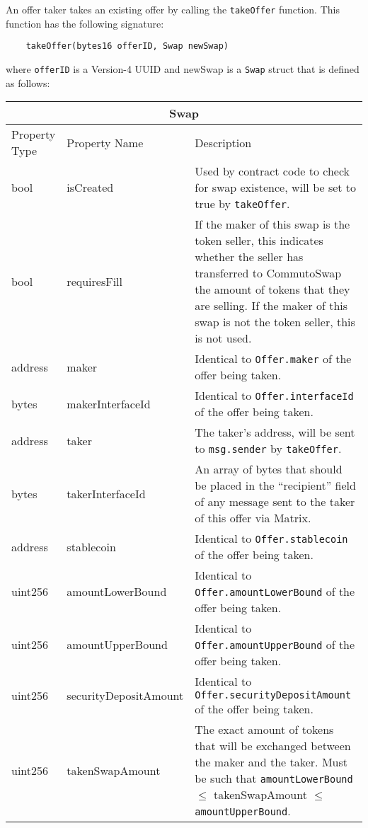 \documentclass[11pt]{article}
\begin{document}
    An offer taker takes an existing offer by calling the \verb|takeOffer| function.
    This function has the following signature:
    \begin{verbatim}
    takeOffer(bytes16 offerID, Swap newSwap)
    \end{verbatim}
    where \verb|offerID| is a Version-4 UUID and newSwap is a \verb|Swap| struct that is defined as
    follows:
    \begin{longtable}[p]{ |p{2.5cm}|p{4cm}|p{7cm}| }
        \hline
        \multicolumn{3}{|c|}{Swap} \\
        \hline
        Property Type & Property Name & Description \\
        \hline
        bool & isCreated & Used by contract code to check for swap existence, will be set to true by \verb|takeOffer|. \\
        bool & requiresFill & If the maker of this swap is the token seller, this indicates whether the seller has transferred to CommutoSwap the amount of tokens that they are selling.
        If the maker of this swap is not the token seller, this is not used. \\
        address & maker & Identical to \verb|Offer.maker| of the offer being taken. \\
        bytes & makerInterfaceId & Identical to \verb|Offer.interfaceId| of the offer being taken. \\
        address & taker & The taker's address, will be sent to \verb|msg.sender| by \verb|takeOffer|. \\
        bytes & takerInterfaceId & An array of bytes that should be placed in the “recipient” field of
        any message sent to the taker of this offer via Matrix. \\
        address & stablecoin & Identical to \verb|Offer.stablecoin| of the offer being taken. \\
        uint256 & amountLowerBound & Identical to \verb|Offer.amountLowerBound| of the offer being taken. \\
        uint256 & amountUpperBound & Identical to \verb|Offer.amountUpperBound| of the offer being taken. \\
        uint256 & securityDepositAmount & Identical to \verb|Offer.securityDepositAmount| of the offer being taken. \\
        uint256 & takenSwapAmount & The exact amount of tokens that will be exchanged between the maker and the taker.
        Must be such that \verb|amountLowerBound| $\leq$ takenSwapAmount $\leq$ \verb|amountUpperBound|. \\

\end{longtable}
\end{document}
